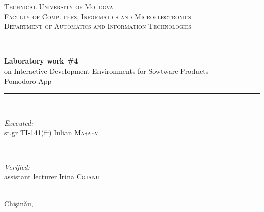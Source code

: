 \documentclass[12pt]{article}
\begin{document}
\begin{titlepage}

\newcommand{\HRule}{\rule{\linewidth}{0.5mm}} 

\center 
 

\textsc{\LARGE Technical University of Moldova}\\[0.8cm] 
\textsc{\Large Faculty of Computers, Informatics and Microelectronics}\\[0.5cm] 
\textsc{\large Department of Automatics and Information Technologies}\\[5.2cm] 


\HRule \\[0.4cm]
{ \huge \bfseries Laboratory work \#4}\\[0.3cm]
{\large on Interactive Development Environments for Sowtware Products}\\
{\large Pomodoro App}\\[0.4cm] 
\HRule \\[5.5cm]
 

\begin{minipage}{0.4\textwidth}
\begin{flushleft} \large
\emph{Executed:}\\
st.gr TI-141(fr) Iulian \textsc{Ma\c{s}aev} 
\end{flushleft}
\end{minipage}
~
\begin{minipage}{0.4\textwidth}
\begin{flushright} \large
\emph{Verified:} \\
assistant lecturer Irina \textsc{Cojanu} 
\end{flushright}
\end{minipage}\\[4cm]


\vfill 
{\large Chi\c{s}in\u{a}u, \the\year}\\[3cm] 



\end{titlepage}



\end{document}
